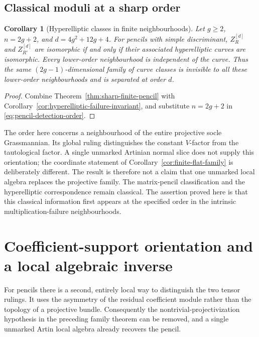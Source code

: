 \documentclass[11pt,reqno]{amsart}
\numberwithin{equation}{section}
\newtheorem{corollary}[theorem]{Corollary}
\theoremstyle{definition}\newtheorem{definition}[theorem]{Definition}
\theoremstyle{remark}\newtheorem{remark}[theorem]{Remark}
\begin{document}
\subsection{Classical moduli at a sharp order}

\begin{corollary}[Hyperelliptic classes in finite neighbourhoods]
\label{cor:finite-hyperelliptic}
Let \(g\ge2\), \(n=2g+2\), and
\(d=4g^2+12g+4\).  For pencils with simple discriminant,
\(Z_R^{[d]}\) and \(Z_{R'}^{[d]}\) are isomorphic if
and only if their associated hyperelliptic curves are isomorphic.
Every lower-order neighbourhood is independent of the curve.
Thus the same \((2g-1)\)-dimensional family of curve classes
is invisible to all these lower-order neighbourhoods and is
separated at order \(d\).
\end{corollary}
\begin{proof}
Combine Theorem~\ref{thm:sharp-finite-pencil} with
Corollary~\ref{cor:hyperelliptic-failure-invariant}, and substitute
\(n=2g+2\) in \eqref{eq:pencil-detection-order}.
\end{proof}

The order here concerns a neighbourhood of the entire projective
socle Grassmannian.  Its global ruling distinguishes the constant
\(V\)-factor from the tautological factor.  A single unmarked
Artinian normal slice does not supply this orientation; the
coordinate statement of Corollary~\ref{cor:finite-flat-family}
is deliberately different.  The result is therefore not a claim
that one unmarked local algebra replaces the projective family.
The matrix-pencil classification and the hyperelliptic
correspondence remain classical.  The assertion proved here is
that this classical information first appears at the specified
order in the intrinsic multiplication-failure neighbourhoods.


\section{Coefficient-support orientation and a local algebraic inverse}
\label{sec:local-inverse-v146}

For pencils there is a second, entirely local way to distinguish the
two tensor rulings.  It uses the asymmetry of the residual coefficient
module rather than the topology of a projective bundle.  Consequently
the nontrivial-projectivization hypothesis in the preceding family
theorem can be removed, and a single unmarked Artin local algebra
already recovers the pencil.
\end{document}

